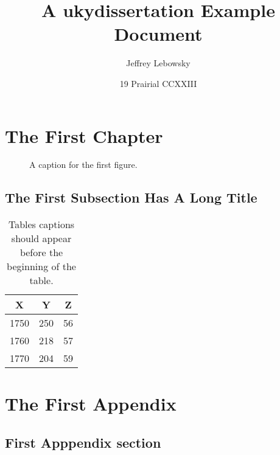 \documentclass[endorse]{ukydissertation}
\title{A \textsf{ukydissertation} Example Document}
\author{Jeffrey Lebowsky}
\date{19 Prairial CCXXIII}
\begin{document}
\makefrontmatter

\chapter{The First Chapter}
\lipsum[4-10]

\begin{figure}
  \centering
  \caption[A name for the ToC]{A caption for the first figure.}
  \label{fig:numberone}
\end{figure}

\section[A Shorter Title for ToC]
{The First Subsection Has A Long Title}

\lipsum[11]
\begin{table}
  \caption[A Short Table Title for the ToC]%
  {Tables captions should appear before the beginning of the table.}
  \vspace{\baselineskip}\centering
  \begin{tabular}{ccc}
    \hline
    X & Y & Z\\
    \hline
    1750 & 250 & 56\\
    1760 & 218 & 57\\
    1770 & 204 & 59\\
    \hline
  \end{tabular}
\end{table}
\lipsum[12-15]

\backmatter
\chapter{The First Appendix}
\lipsum[16-17]

\section{First Apppendix section}
\lipsum[18-22]



\vita
\lipsum[23-25]
\end{document}

